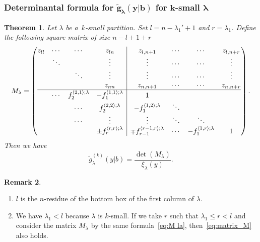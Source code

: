 \documentclass[10pt,a4paper]{amsart}
\numberwithin{equation}{section}
\newcommand{\bl}{\mathbf{l}}
\newcommand{\co}{\xi}
\newcommand{\la}{\lambda}
\newcommand{\ha}{f}
\newtheorem{Theorem}{Theorem}[section]
\theoremstyle{definition}
\newtheorem{Remark}[Theorem]{Remark}
\begin{document}
\subsubsection[Determinantal formula for g\_la(y|b) for k-small la]{Determinantal formula for $\boldsymbol{\tilde{g}_\la(y|b)}$ for $\boldsymbol{k}$-small $\boldsymbol{\la}$}



\begin{Theorem}\label{thm:determinant_formula_for_ksmall_g}
Let $\lambda$ be a~$k$-small partition.
Set $
l=n-\la_1'+1$
and $r=\la_1$.
Define the following
square matrix of size $n-l+1+r$
\begin{equation}\label{eq:M la}
 M_\la=
 \left(
\begin{array}{@{}cccc|cccc@{}}
 z_{ll}&\cdots &\cdots &z_{ln}&z_{l,n+1}&\cdots&\cdots&z_{l,n+r}\\
 &\ddots& &\vdots&\vdots&\cdots&\cdots&\vdots\\
 &&\ddots &\vdots&\vdots&\cdots&\cdots&\vdots\\
 & &&z_{nn}&z_{n,n+1}&\cdots&\cdots&z_{n,n+r}\\ \hline
 &\cdots
 & \ha_2^{\langle {2,1}\rangle;\la} & -\ha_1^{\langle 1,1\rangle;\la} & 1 & & \\
 &&\cdots
 &\ha_2^{\langle 2,2\rangle;\la}&-\ha_1^{\langle 1,2\rangle;\la} & \ddots &&\\
 &&\cdots&\vdots&\vdots & \ddots &\ddots&\\
 &&&\pm \ha_r^{\langle r,r\rangle;\la}&\mp \ha_{r-1}^{\langle r-1,r\rangle;\la}&\cdots &-\ha_1^{\langle 1,r\rangle;\la} &1
\end{array}
\right).
\end{equation}
Then we have
\begin{equation}\label{eq:matrix_M}
\tilde{g}^{(k)}_{\lambda}(y|b)=
\frac{\det(M_\lambda)}{\co_\la(y)}.
\end{equation}
\end{Theorem}



\begin{Remark}\quad
\begin{enumerate}
\itemsep=0pt
\item[(1)] $l$ is the $n$-residue of the bottom box of the first column of $\la$.
 \item[(2)] We have $\la_1<l$ because $\la$ is $k$-small.
If we take $r$ such that $\la_1\le r<l$ and
 consider the matrix $M_\la$ by the same formula~\eqref{eq:M la},
 then~\eqref{eq:matrix_M} also holds.
\end{enumerate}

\end{Remark}
\end{document}

